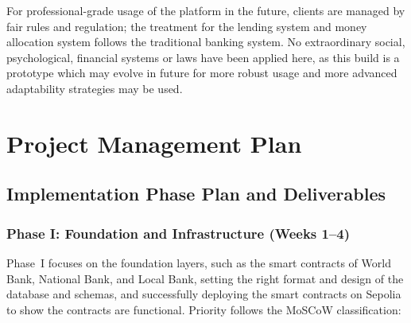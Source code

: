\documentclass[12pt,a4paper]{report}
\begin{document}
For professional-grade usage of the platform in the future, clients are managed by fair rules and regulation; the treatment for the lending system and money allocation system follows the traditional banking system. No extraordinary social, psychological, financial systems or laws have been applied here, as this build is a prototype which may evolve in future for more robust usage and more advanced adaptability strategies may be used.

\section{Project Management Plan}
\label{sec:project-management-plan}

\subsection{Implementation Phase Plan and Deliverables}
\label{sec:impl-phase-plan}

\subsubsection{Phase I: Foundation and Infrastructure (Weeks 1--4)}

Phase~I focuses on the foundation layers, such as the smart contracts of World Bank, National Bank, and Local Bank, setting the right format and design of the database and schemas, and successfully deploying the smart contracts on Sepolia to show the contracts are functional. Priority follows the MoSCoW classification:
\end{document}
